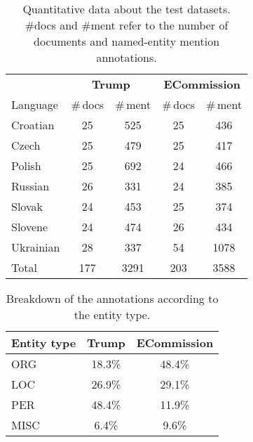 \documentclass[11pt]{article}
\begin{document}
\begin{table}
  \begin{center}
    \begin{footnotesize}
      \begin{tabular}{lcccc}
        \toprule 
        & \multicolumn{2}{c}{\textbf{{\sc Trump}}} & \multicolumn{2}{c}{\textbf{{\sc ECommission}}} \\
        \cmidrule(lr){2-3}
        \cmidrule(lr){4-5}
        Language &  \#\,docs & \#\,ment & \#\,docs & \#\,ment \\
        \midrule
        Croatian & 25 & 525 & 25 & 436 \\
        Czech & 25 & 479  & 25 & 417 \\
        Polish & 25 & 692  & 24 & 466 \\
        Russian & 26 & 331  & 24 & 385 \\
        Slovak  & 24 & 453  & 25 & 374 \\
        Slovene & 24 & 474  & 26 & 434 \\
        Ukrainian & 28 & 337  & 54 & 1078 \\
        \midrule
        Total & 177 & 3291  & 203 & 3588 \\

        \bottomrule
      \end{tabular}
    \end{footnotesize}
  \end{center}
  \caption{Quantitative data about the test datasets. \#docs and \#ment refer to the number of documents and named-entity mention annotations.}
  \label{tab:datasets}
\end{table}

\begin{table}
  \begin{center}
    \begin{footnotesize}
      \begin{tabular}{lcc}
        \toprule 
        Entity type & {\textbf{{\sc Trump}}} & {\textbf{{\sc ECommission}}} \\
        \midrule
        ORG & 18.3\% & 48.4\% \\
        LOC & 26.9\% & 29.1\% \\
        PER & 48.4\% & 11.9\% \\
        MISC & 6.4\% & 9.6\% \\
        \bottomrule
      \end{tabular}
    \end{footnotesize}
  \end{center}
  \caption{Breakdown of the annotations according to the entity type.}
  \label{tab:datasets-2}
\end{table}
\end{document}
